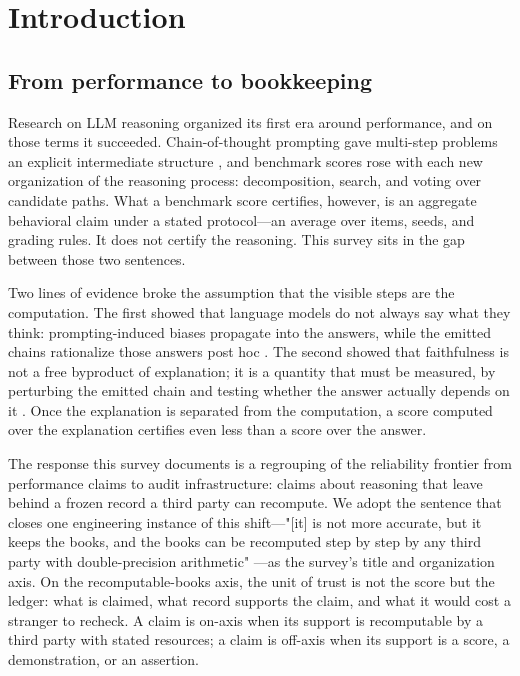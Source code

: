 \documentclass[11pt,a4paper]{article}
\begin{document}
\section{Introduction}

\subsection{From performance to bookkeeping}

Research on LLM reasoning organized its first era around performance, and on those terms it succeeded. Chain-of-thought prompting gave multi-step problems an explicit intermediate structure \cite{key01}, and benchmark scores rose with each new organization of the reasoning process: decomposition, search, and voting over candidate paths. What a benchmark score certifies, however, is an aggregate behavioral claim under a stated protocol—an average over items, seeds, and grading rules. It does not certify the reasoning. This survey sits in the gap between those two sentences.

Two lines of evidence broke the assumption that the visible steps are the computation. The first showed that language models do not always say what they think: prompting-induced biases propagate into the answers, while the emitted chains rationalize those answers post hoc \cite{key02}. The second showed that faithfulness is not a free byproduct of explanation; it is a quantity that must be measured, by perturbing the emitted chain and testing whether the answer actually depends on it \cite{key03}. Once the explanation is separated from the computation, a score computed over the explanation certifies even less than a score over the answer.

The response this survey documents is a regrouping of the reliability frontier from performance claims to audit infrastructure: claims about reasoning that leave behind a frozen record a third party can recompute. We adopt the sentence that closes one engineering instance of this shift—"[it] is not more accurate, but it keeps the books, and the books can be recomputed step by step by any third party with double-precision arithmetic" \cite{key04}—as the survey's title and organization axis. On the recomputable-books axis, the unit of trust is not the score but the ledger: what is claimed, what record supports the claim, and what it would cost a stranger to recheck. A claim is on-axis when its support is recomputable by a third party with stated resources; a claim is off-axis when its support is a score, a demonstration, or an assertion.
\end{document}
